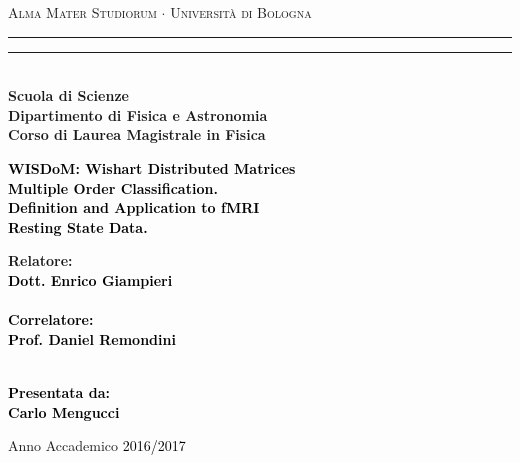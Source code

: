 \documentclass[12pt,a4paper]{report}
\begin{document}
\begin{titlepage}
%
%
%
%
\begin{center}
{{\Large{\textsc{Alma Mater Studiorum $\cdot$ Universit\`a di Bologna}}}} 
\rule[0.1cm]{15.8cm}{0.1mm}
\rule[0.5cm]{15.8cm}{0.6mm}
\\\vspace{3mm}
%
%
{\small{\bf Scuola di Scienze \\ 
Dipartimento di Fisica e Astronomia\\
Corso di Laurea Magistrale in Fisica}}


\end{center}

\vspace{23mm}

\begin{center}\textcolor{black}{
%
%
{\LARGE{\bf WISDoM: Wishart Distributed Matrices}}\\
\vspace{2mm}
{\LARGE{\bf Multiple Order Classification.}}\\
\vspace{2mm}
{\LARGE{\bf Definition and Application to fMRI}}\\
\vspace{2mm}
{\LARGE{\bf Resting State Data.}}\\
}\end{center}

\vspace{45mm} \par \noindent

\begin{minipage}[t]{0.47\textwidth}
%
%
{\large{\bf Relatore: \vspace{2mm}\\\textcolor{black}{
Dott. Enrico Giampieri}\\\\
%
%
%
\textcolor{black}{
\bf Correlatore: 
\vspace{2mm}\\
Prof. Daniel Remondini\\\\}}}
\end{minipage}
%
\hfill
%
\begin{minipage}[t]{0.47\textwidth}\raggedleft \textcolor{black}{
{\large{\bf Presentata da:
\vspace{2mm}\\
%
%
Carlo Mengucci}}}
\end{minipage}

\vspace{20mm}

\begin{center}
%
%
Anno Accademico \textcolor{black}{ 2016/2017}
\end{center}

\end{titlepage}
\end{document}
